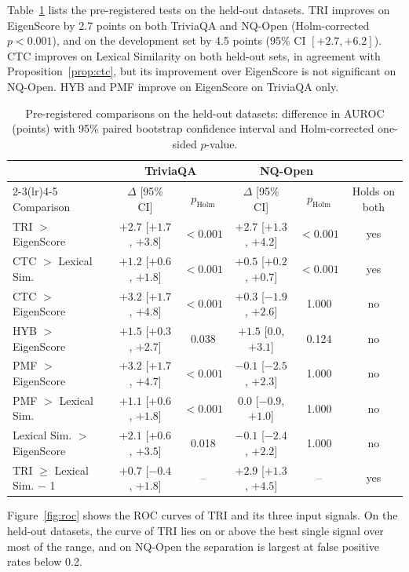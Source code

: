 \documentclass[conference]{IEEEtran}
\begin{document}
Table~\ref{tab:held} lists the pre-registered tests on the held-out datasets. TRI improves on EigenScore by 2.7 points on both TriviaQA and NQ-Open (Holm-corrected $p<0.001$), and on the development set by 4.5 points (95\% CI $[+2.7,+6.2]$). CTC improves on Lexical Similarity on both held-out sets, in agreement with Proposition~\ref{prop:ctc}, but its improvement over EigenScore is not significant on NQ-Open. HYB and PMF improve on EigenScore on TriviaQA only.

\begin{table}[t]
\centering
\caption{Pre-registered comparisons on the held-out datasets: difference in AUROC (points) with 95\% paired bootstrap confidence interval and Holm-corrected one-sided $p$-value.}
\label{tab:held}
\small
\setlength{\tabcolsep}{4pt}
\begin{tabular}{@{}lccccc@{}}
\toprule
& \multicolumn{2}{c}{TriviaQA} & \multicolumn{2}{c}{NQ-Open} & \\
\cmidrule(lr){2-3}\cmidrule(lr){4-5}
Comparison & $\Delta$ [95\% CI] & $p_{\mathrm{Holm}}$ & $\Delta$ [95\% CI] & $p_{\mathrm{Holm}}$ & Holds on both \\
\midrule
TRI $>$ EigenScore & $+2.7$ [$+1.7$, $+3.8$] & $<0.001$ & $+2.7$ [$+1.3$, $+4.2$] & $<0.001$ & yes \\
CTC $>$ Lexical Sim. & $+1.2$ [$+0.6$, $+1.8$] & $<0.001$ & $+0.5$ [$+0.2$, $+0.7$] & $<0.001$ & yes \\
CTC $>$ EigenScore & $+3.2$ [$+1.7$, $+4.8$] & $<0.001$ & $+0.3$ [$-1.9$, $+2.6$] & 1.000 & no \\
HYB $>$ EigenScore & $+1.5$ [$+0.3$, $+2.7$] & 0.038 & $+1.5$ [$0.0$, $+3.1$] & 0.124 & no \\
PMF $>$ EigenScore & $+3.2$ [$+1.7$, $+4.7$] & $<0.001$ & $-0.1$ [$-2.5$, $+2.3$] & 1.000 & no \\
PMF $>$ Lexical Sim. & $+1.1$ [$+0.6$, $+1.8$] & $<0.001$ & $0.0$ [$-0.9$, $+1.0$] & 1.000 & no \\
Lexical Sim. $>$ EigenScore & $+2.1$ [$+0.6$, $+3.5$] & 0.018 & $-0.1$ [$-2.4$, $+2.2$] & 1.000 & no \\
\midrule
TRI $\geq$ Lexical Sim. $-$ 1 & $+0.7$ [$-0.4$, $+1.8$] & -- & $+2.9$ [$+1.3$, $+4.5$] & -- & yes \\
\bottomrule
\end{tabular}
\end{table}

Figure~\ref{fig:roc} shows the ROC curves of TRI and its three input signals. On the held-out datasets, the curve of TRI lies on or above the best single signal over most of the range, and on NQ-Open the separation is largest at false positive rates below 0.2.
\end{document}
